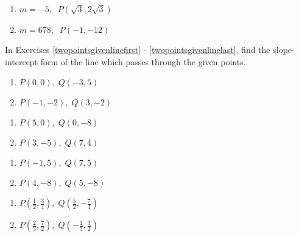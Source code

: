 \documentclass{ximera}
\begin{document}
\begin{multicols}{2}
\begin{enumerate}
\setcounter{enumi}{\value{HW}}

\item $m = -5, \;\; P(\sqrt{3}, 2\sqrt{3})$
\item $m = 678, \;\; P(-1, -12)$ \label{pointslopegivenlinelast}

\setcounter{HW}{\value{enumi}}
\end{enumerate}
\end{multicols}

In Exercises \ref{twopointsgivenlinefirst} - \ref{twopointsgivenlinelast}, find the slope-intercept form of the line which passes through the given points.

\begin{multicols}{2}
\begin{enumerate}
\setcounter{enumi}{\value{HW}}

\item $P(0, 0), \; Q(-3, 5)$ \label{twopointsgivenlinefirst}
\item $P(-1, -2), \; Q(3, -2)$

\setcounter{HW}{\value{enumi}}
\end{enumerate}
\end{multicols}

\begin{multicols}{2}
\begin{enumerate}
\setcounter{enumi}{\value{HW}}

\item $P(5, 0), \; Q(0, -8)$
\item $P(3, -5), \; Q(7, 4)$

\setcounter{HW}{\value{enumi}}
\end{enumerate}
\end{multicols}

\begin{multicols}{2}
\begin{enumerate}
\setcounter{enumi}{\value{HW}}

\item $P(-1,5), \; Q(7, 5)$
\item $P(4, -8), \; Q(5, -8)$

\setcounter{HW}{\value{enumi}}
\end{enumerate}
\end{multicols}

\begin{multicols}{2}
\begin{enumerate}
\setcounter{enumi}{\value{HW}}

\item $P\left(\frac{1}{2}, \frac{3}{4} \right), \; Q\left(\frac{5}{2}, -\frac{7}{4} \right)$
\item $P\left(\frac{2}{3}, \frac{7}{2} \right), \; Q\left(-\frac{1}{3}, \frac{3}{2} \right)$

\setcounter{HW}{\value{enumi}}
\end{enumerate}
\end{multicols}
\end{document}
